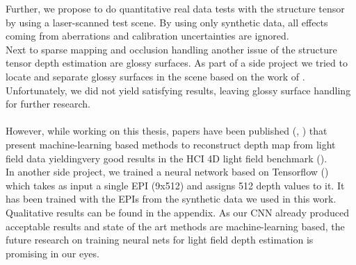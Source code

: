 \documentclass  [
  paper    = a4,
  BCOR     = 10mm,
  twoside,
  fontsize = 12pt,
  fleqn,
  toc      = bibnumbered,
  toc      = listofnumbered,
  numbers  = noendperiod,
  headings = normal,
  listof   = leveldown,
  version  = 3.03
]                                       {scrreprt}
\begin{document}
Further, we propose to do quantitative real data tests with the structure tensor by using a laser-scanned test scene. By using only synthetic data, all effects coming from aberrations and calibration uncertainties are ignored.\\
Next to sparse mapping and occlusion handling another issue of the structure tensor depth estimation are glossy surfaces. As part of a side project we tried to locate and separate glossy surfaces in the scene based on the work of \cite{tao2017shape}. Unfortunately, we did not yield satisfying results, leaving glossy surface handling for further research.\\
\\ 
However, while working on this thesis, papers have been published (\cite{luo2017epi}, \cite{shin18epinet}) that present machine-learning based methods to reconstruct depth map from light field data yieldingvery good results in the HCI 4D light field benchmark (\cite{hci_benchmark}).\\
In another side project, we trained a neural network based on Tensorflow (\cite{tensorflow2015-whitepaper}) which takes as input a single EPI (9x512) and assigns 512 depth values to it. It has been trained with the EPIs from the synthetic data we used in this work. Qualitative results can be found in the appendix. As our CNN already produced acceptable results and state of the art methods are machine-learning based, the future research on training neural nets for light field depth estimation is promising in our eyes.
\end{document}

